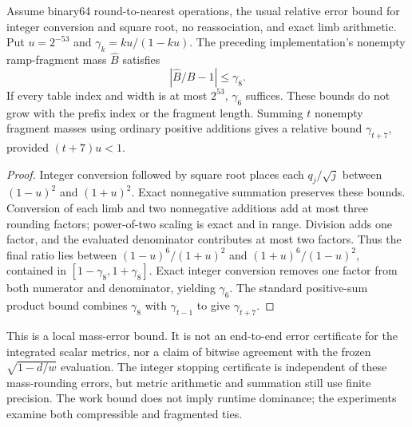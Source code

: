 \begin{proposition}
Assume binary64 round-to-nearest operations, the usual relative error
bound for integer conversion and square root, no reassociation, and exact
limb arithmetic. Put $u=2^{-53}$ and $\gamma_k=ku/(1-ku)$.
The preceding implementation's nonempty ramp-fragment mass $\widehat B$
satisfies
\[
 \left|\widehat B/B-1\right|\le\gamma_8.
\]
If every table index and width is at most $2^{53}$, $\gamma_6$ suffices.
These bounds do not grow with the prefix index or the fragment length.
Summing $t$ nonempty fragment masses using ordinary positive additions
gives a relative bound $\gamma_{t+7}$, provided $(t+7)u<1$.
\end{proposition}
\begin{proof}
Integer conversion followed by square root places each $q_j/\sqrt j$
between $(1-u)^2$ and $(1+u)^2$. Exact nonnegative summation preserves
these bounds. Conversion of each limb and two nonnegative additions add
at most three rounding factors; power-of-two scaling is exact and in
range. Division adds one factor, and the evaluated denominator contributes
at most two factors. Thus the final ratio lies between
$(1-u)^6/(1+u)^2$ and $(1+u)^6/(1-u)^2$, contained in
$[1-\gamma_8,1+\gamma_8]$. Exact integer conversion removes one factor
from both numerator and denominator, yielding $\gamma_6$. The standard
positive-sum product bound combines $\gamma_8$ with $\gamma_{t-1}$ to
give $\gamma_{t+7}$.
\end{proof}

This is a local mass-error bound. It is not an end-to-end error certificate
for the integrated scalar metrics, nor a claim of bitwise agreement with
the frozen $\sqrt{1-d/w}$ evaluation. The integer stopping certificate
is independent of these mass-rounding errors, but metric arithmetic and
summation still use finite precision. The work bound does not imply runtime
dominance; the experiments examine both compressible and fragmented ties.
